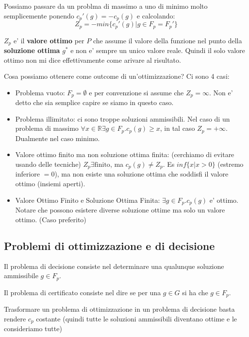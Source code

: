 Possiamo passare da un problma di massimo a uno di minimo molto semplicemente ponendo $ c_p'(g) = -c_p(g) $ e calcolando:
\[
  Z_p = - min \{c_p'(g) | g \in F_p = F_p'\}
\]

$ Z_p $ e' il \textbf{valore ottimo} per $ P $ che assume il valore della funzione nel punto della \textbf{soluzione ottima} $ g^* $ e non e' sempre un unico valore reale. Quindi il solo valore ottimo non mi dice effettivamente come arivare al risultato. 


Cosa possiamo ottenere come outcome di un'ottimizzazione? Ci sono 4 casi:
\begin{itemize}
\item Problema vuoto: $ F_p = \emptyset $ e per convenzione si assume che $ Z_p = \infty $. Non e' detto che sia semplice capire se siamo in questo caso.
\item Problema illimitato: ci sono troppe soluzioni ammissibili. Nel caso di un problema di massimo $ \forall x \in \mathbb{R} \exists g \in F_p. c_p(g) \geq x $, in tal caso $ Z_p = +\infty $. Dualmente nel caso minimo.
\item Valore ottimo finito ma non soluzione ottima finita: (cerchiamo di evitare usando delle tecniche) $ Z_p \exists \text{finito} $, ma $ c_p(g) \neq Z_p $. Es $ inf \{x | x > 0\} $ (estremo inferiore $ =0 $), ma non esiste una soluzione ottima che soddisfi il valore ottimo (insiemi aperti).
\item Valore Ottimo Finito e Soluzione Ottima Finita: $ \exists g \in F_p. c_p(g) $ e' ottimo. Notare che possono esistere diverse soluzione ottime ma solo un valore ottimo. (Caso preferito)
\end{itemize}

\subsection{Problemi di ottimizzazione e di decisione}
Il problema di decisione consiste nel determinare una qualunque soluzione ammissibile $ g \in F_p $. 

Il problema di certificato consiste nel dire se per una $ g \in G $ si ha che $ g \in F_p $.

Trasformare un problema di ottimizzazione in un problema di decisione basta rendere $ c_p $ costante (quindi tutte le soluzioni ammissibili diventano ottime e le consideriamo tutte)

